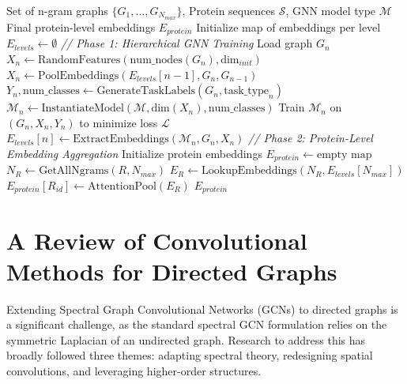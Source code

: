 \documentclass[utf8]{frontiers_suppmat}
\newcommand{\procedurecomment}[1]{\Statex \textit{// #1}}
\begin{document}
\begin{algorithm}[H]
	\caption{$ProtGram-DirectGCN$: Hierarchical Training}
	\label{alg:ProtGramTraining}
	\begin{algorithmic}[1]
		\Require Set of n-gram graphs $\{G_1, \dots, G_{N_{max}}\}$, Protein sequences $\mathcal{S}$, GNN model type $\mathcal{M}$
		\Ensure Final protein-level embeddings $E_{protein}$
		\Statex
		\State Initialize map of embeddings per level $E_{levels} \gets \emptyset$
		\Statex
		\procedurecomment{Phase 1: Hierarchical GNN Training}
		\State Load graph $G_n$
		\State $X_n \gets \text{RandomFeatures}(\text{num\_nodes}(G_n), \text{dim}_{init})$
		\Else
		\State $X_n \gets \text{PoolEmbeddings}(E_{levels}[n-1], G_n, G_{n-1})$ 
		\EndIf
		\State $Y_n, \text{num\_classes} \gets \text{GenerateTaskLabels}(G_n, \text{task\_type}_n)$ 
		\State $\mathcal{M}_n \gets \text{InstantiateModel}(\mathcal{M}, \text{dim}(X_n), \text{num\_classes})$
		\State Train $\mathcal{M}_n$ on $(G_n, X_n, Y_n)$ to minimize loss $\mathcal{L}$
		\State $E_{levels}[n] \gets \text{ExtractEmbeddings}(\mathcal{M}_n, G_n, X_n)$ 
		\EndFor
		\Statex
		\procedurecomment{Phase 2: Protein-Level Embedding Aggregation}
		\State Initialize protein embeddings $E_{protein} \gets \text{empty map}$
		\State $N_R \gets \text{GetAllNgrams}(R, N_{max})$
		\State $E_R \gets \text{LookupEmbeddings}(N_R, E_{levels}[N_{max}])$ 
		\State $E_{protein}[R_{id}] \gets \text{AttentionPool}(E_R)$
		\EndFor
		\State \Return $E_{protein}$
	\end{algorithmic}
\end{algorithm}
	
	\section{A Review of Convolutional Methods for Directed Graphs}
	
	Extending Spectral Graph Convolutional Networks (GCNs) to directed graphs is a significant challenge, as the standard spectral GCN formulation relies on the symmetric Laplacian of an undirected graph. Research to address this has broadly followed three themes: adapting spectral theory, redesigning spatial convolutions, and leveraging higher-order structures.
	
\end{document}
